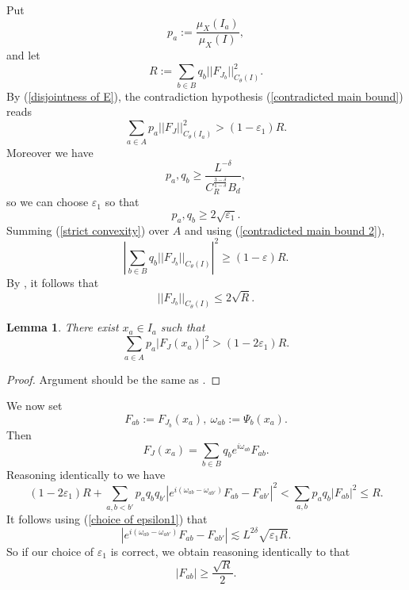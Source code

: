 \documentclass[reqno,10pt]{amsart}
\newtheorem{lemma}[theorem]{Lemma}
\theoremstyle{definition}
\numberwithin{equation}{section}
\begin{document}
Put 
$$p_a := \frac{\mu_X(I_a)}{\mu_X(I)},$$
and let 
$$R := \sum_{b \in B} q_b ||F_{J_b}||_{C_\theta(I)}^2.$$
By (\ref{disjointness of E}), the contradiction hypothesis (\ref{contradicted main bound}) reads
\begin{equation}\label{contradicted main bound 2}
\sum_{a \in A} p_a ||F_J||_{C_\theta(I_a)}^2 > (1 - \varepsilon_1) R.
\end{equation}
Moreover we have 
\begin{equation}
p_a, q_b \geq \frac{L^{-\delta}}{C_R^{\frac{3 - \delta}{1 - \delta}} B_d},
\end{equation}
so we can choose $\varepsilon_1$ so that 
\begin{equation}\label{choice of epsilon1}
p_a, q_b \geq 2\sqrt{\varepsilon_1}.
\end{equation}
Summing (\ref{strict convexity}) over $A$ and using (\ref{contradicted main bound 2}),
$$\left|\sum_{b \in B} q_b ||F_{J_b}||_{C_\theta(I)}\right|^2 \geq (1 - \varepsilon)R.$$
By \cite[(2.17)]{Dyatlov_2018}, it follows that 
\begin{equation}\label{child F is under R}
||F_{J_b}||_{C_\theta(I)} \leq 2 \sqrt R.
\end{equation}

\begin{lemma}
There exist $x_a \in I_a$ such that 
$$\sum_{a \in A} p_a |F_J(x_a)|^2 > (1 - 2\varepsilon_1)R.$$
\end{lemma}
\begin{proof}
Argument should be the same as \cite[Lemma 3.5]{Dyatlov_2018}.
\end{proof}

We now set 
$$F_{ab} := F_{J_b}(x_a), ~\omega_{ab} := \Psi_b(x_a).$$
Then 
$$F_J(x_a) = \sum_{b \in B} q_b e^{i\omega_{ab}} F_{ab}.$$
Reasoning identically to \cite[(3.25), (3.26)]{Dyatlov_2018} we have 
\begin{equation}\label{Dyatlov325}
(1 - 2\varepsilon_1)R + \sum_{a, b < b'} p_a q_b q_{b'} |e^{i(\omega_{ab} - \omega_{ab'})} F_{ab} - F_{ab'}|^2 < \sum_{a, b} p_a q_b |F_{ab}|^2 \leq R.
\end{equation}
It follows using (\ref{choice of epsilon1}) that 
$$|e^{i(\omega_{ab} - \omega_{ab'})} F_{ab} - F_{ab'}| \lesssim L^{2\delta} \sqrt{\varepsilon_1 R}.$$
So if our choice of $\varepsilon_1$ is correct, we obtain reasoning identically to \cite[Lemma 3.6]{Dyatlov_2018} that 
\begin{equation}\label{F isnt small}
|F_{ab}| \geq \frac{\sqrt R}{2}.
\end{equation}
\end{document}
